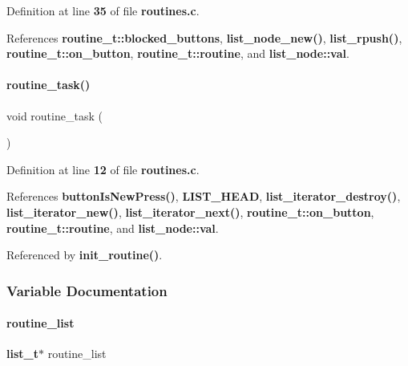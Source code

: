 Definition at line \textbf{ 35} of file \textbf{ routines.\+c}.



References \textbf{ routine\+\_\+t\+::blocked\+\_\+buttons}, \textbf{ list\+\_\+node\+\_\+new()}, \textbf{ list\+\_\+rpush()}, \textbf{ routine\+\_\+t\+::on\+\_\+button}, \textbf{ routine\+\_\+t\+::routine}, and \textbf{ list\+\_\+node\+::val}.

\mbox{\label{routines_8c_a230cdcefb410a429fb6baba1f88fc9ba}} 
\paragraph{routine\+\_\+task()}
{\footnotesize\ttfamily void routine\+\_\+task (\begin{DoxyParamCaption}{ }\end{DoxyParamCaption})}



Definition at line \textbf{ 12} of file \textbf{ routines.\+c}.



References \textbf{ button\+Is\+New\+Press()}, \textbf{ L\+I\+S\+T\+\_\+\+H\+E\+AD}, \textbf{ list\+\_\+iterator\+\_\+destroy()}, \textbf{ list\+\_\+iterator\+\_\+new()}, \textbf{ list\+\_\+iterator\+\_\+next()}, \textbf{ routine\+\_\+t\+::on\+\_\+button}, \textbf{ routine\+\_\+t\+::routine}, and \textbf{ list\+\_\+node\+::val}.



Referenced by \textbf{ init\+\_\+routine()}.



\subsubsection{Variable Documentation}
\mbox{\label{routines_8c_a4d70ab7b0355718354a9678801101aa2}} 
\paragraph{routine\+\_\+list}
{\footnotesize\ttfamily \textbf{ list\+\_\+t}$\ast$ routine\+\_\+list\hspace{0.3cm}{\ttfamily [static]}}




